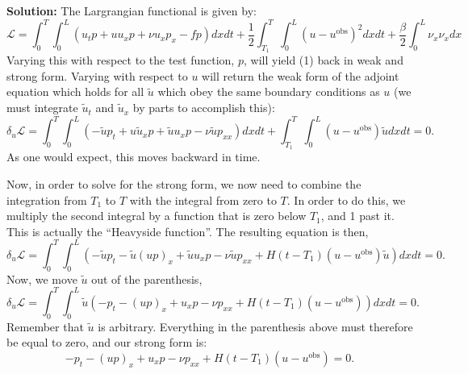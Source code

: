 \documentclass[11pt]{article}
\newenvironment{solution}{\begin{trivlist}\item[]{\bf Solution:}}
                      {\end{trivlist}}
\begin{document}
\begin{enumerate}
\begin{solution}
The Largrangian functional is given by: 
\begin{equation}
\mathcal{L} = \int_0^T \int_0^L (u_t p + u u_x p + \nu u_{x} p_x - f p) dx dt
+ \frac{1}{2}\int_{T_1}^T\int_0^L(u-u^{\text{obs}})^2dxdt  
+ \frac{\beta}{2} \int_0^L \nu_x \nu_x dx  
\label{lagrangian}
\end{equation}
Varying this with respect to the test function, $p$, will yield (1) back
 in weak and strong form. Varying with respect to $u$ will return the
 weak form of the adjoint equation which holds for all $\tilde{u}$ which
 obey the same boundary conditions as $u$ (we must integrate $\tilde u_t$
 and $\tilde u_x$ by parts to accomplish this):   
\begin{equation}
\delta_u \mathcal{L} = \int_0^T\int_0^L\left(-\tilde{u} p_t +
					u\tilde{u}_x p + \tilde{u}u_x p  
		 - \nu\tilde{u} p_{xx}\right)dxdt  
+ \int_{T_1}^T\int_0^L(u-u^{\text{obs}})\tilde{u}dxdt = 0.
\end{equation}
As one would expect, this moves backward in time. 


 Now, in order to solve for the strong form, we now need to combine the
 integration from $T_1$ to $T$ with the integral from zero to $T$. In
 order to do this, we multiply the second integral by a function that is
 zero below $T_1$, and 1 past it. This is actually the ``Heavyside
 function''. The resulting equation is then, 
\begin{equation}
\delta_u \mathcal{L} = \int_0^T\int_0^L \left( -\tilde{u} p_t -
					\tilde{u}(u p)_x + \tilde{u}u_x p  
		 - \nu\tilde{u} p_{xx}
+ H(t-T_1)(u-u^{\text{obs}})\tilde{u} \right)dxdt = 0.
\end{equation}
Now, we move $\tilde u$ out of the parenthesis, 
\begin{equation}
\delta_u \mathcal{L} = \int_0^T\int_0^L \tilde u \left( - p_t -
					(u p)_x + u_x p  
		 - \nu p_{xx}
+ H(t-T_1)(u-u^{\text{obs}}) \right) dxdt = 0.
\end{equation}
Remember that $\tilde u$ is arbitrary. Everything in the parenthesis above must
 therefore be equal to zero, and our strong form is:
\begin{equation}
- p_t - (u p)_x + u_x p - \nu p_{xx} + H(t-T_1)(u-u^{\text{obs}}) = 0.
\end{equation}

\end{solution}
\end{enumerate}
\end{document}
